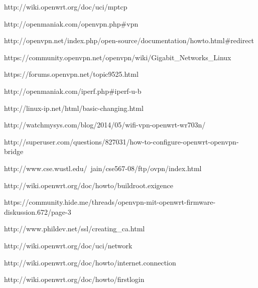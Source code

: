 \begin{thebibliography}{9}

http://wiki.openwrt.org/doc/uci/mptcp

http://openmaniak.com/openvpn.php#vpn

http://openvpn.net/index.php/open-source/documentation/howto.html#redirect

https://community.openvpn.net/openvpn/wiki/Gigabit_Networks_Linux

https://forums.openvpn.net/topic9525.html

http://openmaniak.com/iperf.php#iperf-u-b

http://linux-ip.net/html/basic-changing.html

http://watchmysys.com/blog/2014/05/wifi-vpn-openwrt-wr703n/

http://superuser.com/questions/827031/how-to-configure-openwrt-openvpn-bridge

http://www.cse.wustl.edu/~jain/cse567-08/ftp/ovpn/index.html

http://wiki.openwrt.org/doc/howto/buildroot.exigence

https://community.hide.me/threads/openvpn-mit-openwrt-firmware-diskussion.672/page-3

http://www.phildev.net/ssl/creating_ca.html

http://wiki.openwrt.org/doc/uci/network

http://wiki.openwrt.org/doc/howto/internet.connection

http://wiki.openwrt.org/doc/howto/firstlogin

\end{thebibliography}
